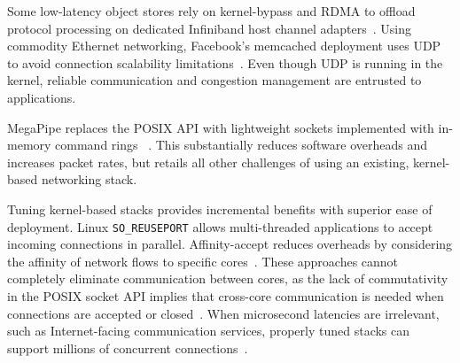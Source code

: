  Some low-latency object stores rely on
kernel-bypass and RDMA to offload protocol processing on dedicated
Infiniband host channel
adapters~\cite{DBLP:conf/sosp/OngaroRSOR11,Jose:2011:MDH,mitchell:rdma,dragojevic14farm}.
Using commodity Ethernet networking, Facebook's memcached deployment
uses UDP to avoid connection scalability
limitations~\cite{nishtala2013scaling}. Even though UDP is running in
the kernel, reliable communication and congestion management are
entrusted to applications.

 MegaPipe replaces the POSIX
API with lightweight sockets implemented with in-memory command
rings~\cite{han2012megapipe} . This substantially reduces software
overheads and increases packet rates, but retails all other challenges
of using an existing, kernel-based networking stack.

 Tuning kernel-based stacks provides
incremental benefits with superior ease of deployment.  Linux
\texttt{SO\_REUSEPORT} allows multi-threaded applications to accept
incoming connections in parallel. Affinity-accept reduces overheads by
considering the affinity of network flows to specific
cores~\cite{DBLP:conf/eurosys/PesterevSZM12}. These approaches cannot
completely eliminate communication between cores, as the lack of
commutativity in the POSIX socket API implies that cross-core
communication is needed when connections are accepted or
closed~\cite{DBLP:conf/sosp/ClementsKZMK13}. When microsecond
latencies are irrelevant, such as Internet-facing communication
services, properly tuned stacks can support millions of concurrent
connections~\cite{whatsapp-2mil}.
